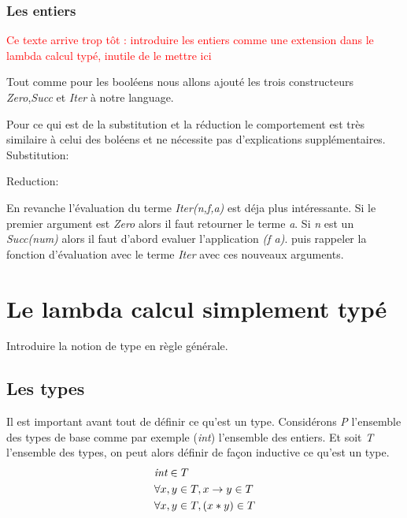 \documentclass {article}
\newcommand{\codefrom}[3]
           {}
\theoremstyle{definition}
\theoremstyle{remark}
\newcommand{\todo}[1]{\textcolor{red}{#1}}
\begin{document}
\codefrom{untyped}{lambda}{bool_evaluation}


\subsubsection{Les entiers}

\todo{Ce texte arrive trop tôt : introduire les entiers comme une extension dans le lambda calcul typé, inutile de le mettre ici}

Tout comme pour les booléens nous allons ajouté les trois constructeurs 
\emph{Zero},\emph{Succ} et \emph{Iter} à notre language.

\codefrom{untyped}{lambda}{nat_term}

Pour ce qui est de la substitution et la réduction le comportement est très
similaire à celui des boléens et ne nécessite pas d'explications supplémentaires.
Substitution:

\codefrom{untyped}{lambda}{nat_substitution}

Reduction:

\codefrom{untyped}{lambda}{nat_reduction}

En revanche l'évaluation du terme \emph{Iter(n,f,a)} est déja plus intéressante.
Si le premier argument est \emph{Zero} alors il faut retourner le terme \emph{a}.
Si \emph{n} est un \emph{Succ(num)} alors il faut d'abord evaluer l'application 
\emph{(f a)}. puis rappeler la fonction d'évaluation avec le terme 
\emph{Iter} avec ces nouveaux arguments.

\codefrom{untyped}{lambda}{nat_evaluation}

\section{Le lambda calcul simplement typé}

Introduire la notion de type en règle générale.

\subsection{Les types}

Il est important avant tout de définir ce qu'est un type.
Considérons \emph{P} l'ensemble des types de base comme par exemple 
(\emph{int}) l'ensemble des entiers.
Et soit \emph{T} l'ensemble des types, on peut alors définir de façon inductive
ce qu'est un type.
\begin{align*}
  &\emph{int} \in T \\
  &\forall x,y \in T, x \rightarrow y \in T \\
  &\forall x,y \in T, (x * y) \in T   
\end{align*}
\end{document}
